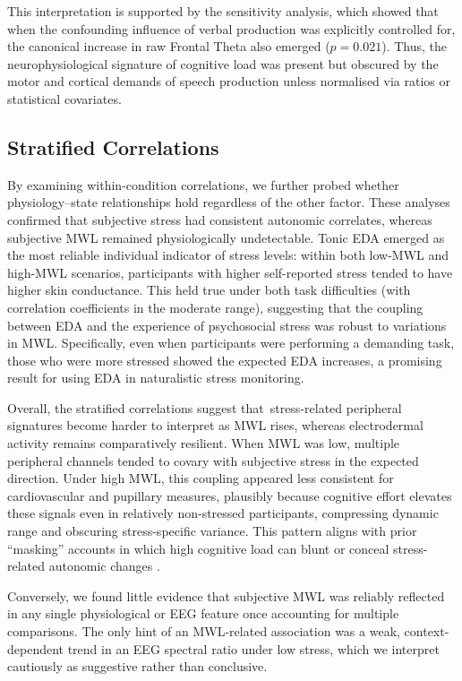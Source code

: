 \documentclass[lettersize,journal]{IEEEtran}
\begin{document}
This interpretation is supported by the sensitivity analysis, which showed that when the confounding influence of verbal production was explicitly controlled for, the canonical increase in raw Frontal Theta also emerged ($p=0.021$). Thus, the neurophysiological signature of cognitive load was present but obscured by the motor and cortical demands of speech production unless normalised via ratios or statistical covariates.

\subsection{Stratified Correlations}

By examining within-condition correlations, we further probed whether physiology–state relationships hold regardless of the other factor. These analyses confirmed that subjective stress had consistent autonomic correlates, whereas subjective MWL remained physiologically undetectable. Tonic EDA emerged as the most reliable individual indicator of stress levels: within both low-MWL and high-MWL scenarios, participants with higher self-reported stress tended to have higher skin conductance. This held true under both task difficulties (with correlation coefficients in the moderate range), suggesting that the coupling between EDA and the experience of psychosocial stress was robust to variations in MWL. Specifically, even when participants were performing a demanding task, those who were more stressed showed the expected EDA increases, a promising result for using EDA in naturalistic stress monitoring.

Overall, the stratified correlations suggest that \,stress-related peripheral signatures become harder to interpret as MWL rises, whereas electrodermal activity remains comparatively resilient. When MWL was low, multiple peripheral channels tended to covary with subjective stress in the expected direction. Under high MWL, this coupling appeared less consistent for cardiovascular and pupillary measures, plausibly because cognitive effort elevates these signals even in relatively non-stressed participants, compressing dynamic range and obscuring stress-specific variance. This pattern aligns with prior ``masking'' accounts in which high cognitive load can blunt or conceal stress-related autonomic changes \cite{conwayEffectStressCognitive2013, setzDiscriminatingStressCognitive2010}.

Conversely, we found little evidence that subjective MWL was reliably reflected in any single physiological or EEG feature once accounting for multiple comparisons. The only hint of an MWL-related association was a weak, context-dependent trend in an EEG spectral ratio under low stress, which we interpret cautiously as suggestive rather than conclusive.
\end{document}
